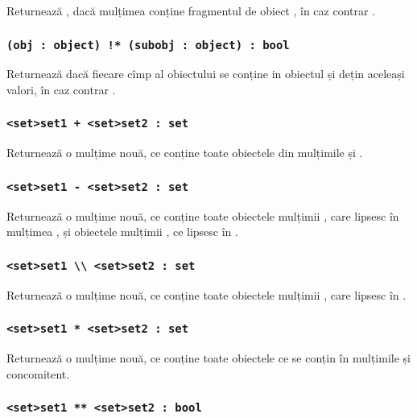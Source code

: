 Returnează \false{}, dacă mulțimea  conține fragmentul de obiect , în caz contrar \true{}.

\subsubsection{\lstinline|(obj : object) !* (subobj : object) : bool|}

Returnează \false{} dacă fiecare cîmp al obiectului  se conține in obiectul  și dețin aceleași valori, în caz contrar \true{}.

\subsubsection{\lstinline|<set>set1 + <set>set2 : set|}

Returnează o mulțime nouă, ce conține toate obiectele din mulțimile  și .

\subsubsection{\lstinline|<set>set1 - <set>set2 : set|}

Returnează o mulțime nouă, ce conține toate obiectele mulțimii , care lipsesc în mulțimea , și obiectele mulțimii , ce lipsesc în .

\subsubsection{\lstinline|<set>set1 \\ <set>set2 : set|}

Returnează o mulțime nouă, ce conține toate obiectele mulțimii , care lipsesc în .

\subsubsection{\lstinline|<set>set1 * <set>set2 : set|}

Returnează o mulțime nouă, ce conține toate obiectele ce se conțin în mulțimile  și  concomitent.

\subsubsection{\lstinline|<set>set1 ** <set>set2 : bool|}

